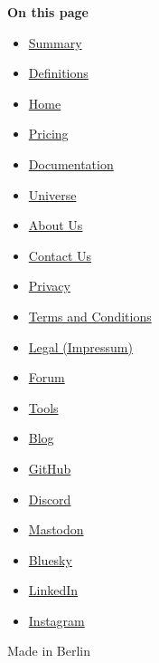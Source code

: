 \textbf{On this page}

\begin{itemize}
\tightlist
\item
  \hyperref[summary]{Summary}
\item
  \hyperref[definitions]{Definitions}
\end{itemize}

\begin{itemize}
\tightlist
\item
  \href{/}{Home}
\item
  \href{/pricing/}{Pricing}
\item
  \href{/docs/}{Documentation}
\item
  \href{/universe/}{Universe}
\item
  \href{/about/}{About Us}
\item
  \href{/contact/}{Contact Us}
\item
  \href{/privacy/}{Privacy}
\item
  \href{https://typst.app/terms}{Terms and Conditions}
\item
  \href{/legal/}{Legal (Impressum)}
\end{itemize}

\begin{itemize}
\tightlist
\item
  \href{https://forum.typst.app}{Forum}
\item
  \href{/tools/}{Tools}
\item
  \href{/blog/}{Blog}
\item
  \href{https://github.com/typst/}{GitHub}
\item
  \href{https://discord.gg/2uDybryKPe}{Discord}
\item
  \href{https://mastodon.social/@typst}{Mastodon}
\item
  \href{https://bsky.app/profile/typst.app}{Bluesky}
\item
  \href{https://www.linkedin.com/company/typst/}{LinkedIn}
\item
  \href{https://instagram.com/typstapp/}{Instagram}
\end{itemize}

Made in Berlin
